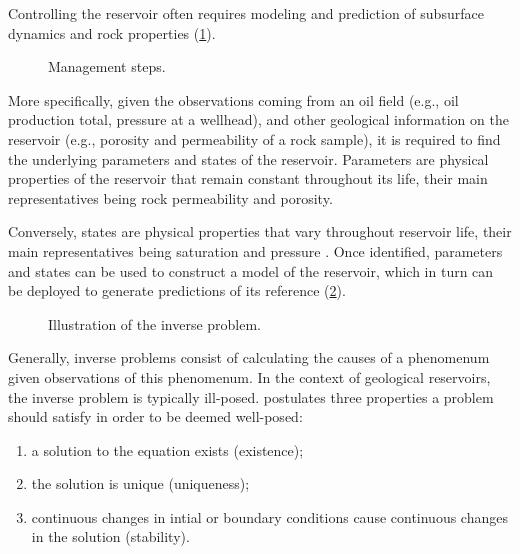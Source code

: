     Controlling the reservoir often requires modeling and prediction of subsurface dynamics and rock properties
    (\cref{fig:wheelchart-context}).
    \begin{figure}
        \centering
        \caption{Management steps.}
        \label{fig:wheelchart-context}
        
    \end{figure}
    
    More specifically, 
    given the observations coming from an oil field (e.g., oil production total, pressure at a wellhead),
    and other geological information on the reservoir (e.g., porosity and permeability of a rock sample),
    it is required to find the underlying parameters and states of the reservoir. 
    Parameters are physical properties of the reservoir that remain constant throughout its life,
    their main representatives being rock permeability and porosity. 

    Conversely, states are physical properties that vary throughout reservoir life,
    their main representatives being saturation and pressure
    \cite[section 4.1]{Emerick:2025}.
    Once identified, parameters and states can be used to construct a model of the reservoir, 
    which in turn can be deployed to generate predictions of its reference (\cref{fig:diagram-inverse-problem}).
    \begin{figure}[htbp]
        \centering
        \caption{Illustration of the inverse problem.}
        \label{fig:diagram-inverse-problem}
        
    \end{figure}

    Generally, inverse problems consist of calculating the causes of a phenomenum given observations of this phenomenum.
    In the context of geological reservoirs, the inverse problem is typically ill-posed.
     postulates three properties a problem should satisfy in order to be deemed well-posed:
    \begin{enumerate}
        \item a solution to the equation exists (existence);
        \item the solution is unique (uniqueness);
        \item continuous changes in intial or boundary conditions cause continuous changes in the solution (stability).
    \end{enumerate} 

